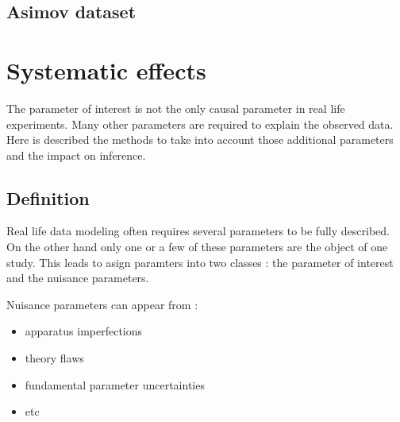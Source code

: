 \subsection{Asimov dataset} %
\label{sub:asimov_dataset}








\section{Systematic effects} %
\label{sec:systematic_effects}


The parameter of interest is not the only causal parameter in real life experiments.
Many other parameters are required to explain the observed data.
Here is described the methods to take into account those additional parameters and the impact on inference. 



\subsection{Definition} %
\label{sub:definition}

Real life data modeling often requires several parameters to be fully described.
On the other hand only one or a few of these parameters are the object of one study.
This leads to asign paramters into two classes : the parameter of interest and the nuisance parameters.

Nuisance parameters can appear from :
\begin{itemize}
	\item apparatus imperfections
	\item theory flaws
	\item fundamental parameter uncertainties
	\item etc
\end{itemize}


